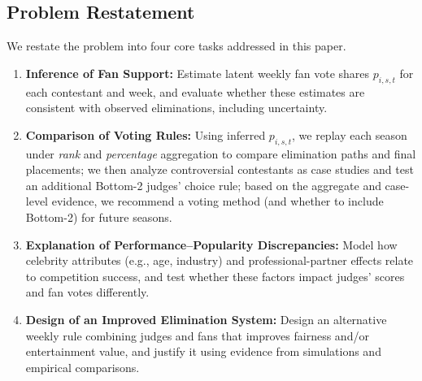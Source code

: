 \documentclass[12pt]{article}
\begin{document}
\subsection{Problem Restatement}
We restate the problem into four core tasks addressed in this paper.

\begin{enumerate}
	\item \textbf{Inference of Fan Support: }
	Estimate latent weekly fan vote shares $p_{i,s,t}$ for each contestant and week, and evaluate
	whether these estimates are consistent with observed eliminations, including uncertainty.
	
	\item \textbf{Comparison of Voting Rules: }
	Using inferred $p_{i,s,t}$, we replay each season under \textit{rank} and \textit{percentage} aggregation to
	compare elimination paths and final placements; we then analyze controversial contestants as case studies and test an additional Bottom-2 judges' choice rule; based on the
	aggregate and case-level evidence, we recommend a voting method (and whether to include Bottom-2) for
	future seasons.
	
	
	\item \textbf{Explanation of Performance–Popularity Discrepancies: }
	Model how celebrity attributes (e.g., age, industry) and professional-partner effects relate to
	competition success, and test whether these factors impact judges' scores and fan votes differently.
	
	\item \textbf{Design of an Improved Elimination System:}
	Design an alternative weekly rule combining judges and fans that improves fairness and/or
	entertainment value, and justify it using evidence from simulations and empirical comparisons.
\end{enumerate}
\end{document}
